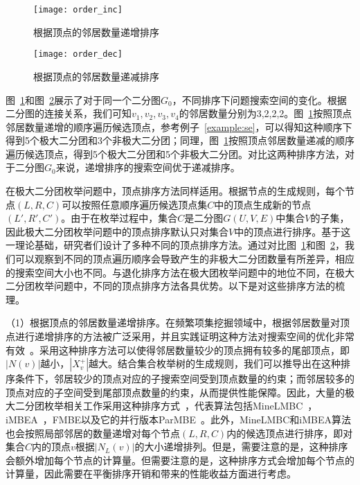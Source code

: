 \begin{figure} [H]
  \center
    \vspace{0.1in}
		\texttt{[image: order\_inc]}
    \vspace{0.05in}
	\caption{根据顶点的邻居数量递增排序}
	\label{fig:order_inc}
\end{figure}


\begin{figure} [H]
  \center
  \vspace{0.1in}
    \texttt{[image: order\_dec]}
    \vspace{0.05in}
  \caption{根据顶点的邻居数量递减排序}
	\label{fig:order_dec}
\end{figure}

\begin{example}
  图~\ref{fig:order_inc}和图~\ref{fig:order_dec}展示了对于同一个二分图$G_0$，不同排序下问题搜索空间的变化。根据二分图的连接关系，我们可知$v_1,v_2,v_3,v_4$的邻居数量分别为3,2,2,2。图~\ref{fig:order_inc}按照顶点邻居数量递增的顺序遍历候选顶点，参考例子~\ref{example:se}，可以得知这种顺序下得到5个极大二分团和3个非极大二分团；同理，图~\ref{fig:order_inc}按照顶点邻居数量递减的顺序遍历候选顶点，得到5个极大二分团和5个非极大二分团。对比这两种排序方法，对于二分图$G_0$来说，递增排序的搜索空间优于递减排序。
\end{example}




在极大二分团枚举问题中，顶点排序方法同样适用。根据节点的生成规则，每个节点$(L,R,C)$可以按照任意顺序遍历候选顶点集$C$中的顶点生成新的节点$(L',R',C')$。由于在枚举过程中，集合$C$是二分图$G(U,V,E)$中集合$V$的子集，因此极大二分团枚举问题中的顶点排序默认只对集合$V$中的顶点进行排序。基于这一理论基础，研究者们设计了多种不同的顶点排序方法。通过对比图~\ref{fig:order_inc}和图~\ref{fig:order_dec}，我们可以观察到不同的顶点遍历顺序会导致产生的非极大二分团数量有所差异，相应的搜索空间大小也不同。与退化排序方法在极大团枚举问题中的地位不同，在极大二分团枚举问题中，不同的顶点排序方法各具优势。以下是对这些排序方法的梳理。

（1）根据顶点的邻居数量递增排序。在频繁项集挖掘领域中，根据邻居数量对顶点进行递增排序的方法被广泛采用，并且实践证明这种方法对搜索空间的优化非常有效~\cite{lcm04}。采用这种排序方法可以使得邻居数量较少的顶点拥有较多的尾部顶点，即$|N(v)|$越小，$|X_v^+|$越大。结合集合枚举树的生成规则，我们可以推导出在这种排序条件下，邻居较少的顶点对应的子搜索空间受到顶点数量的约束；而邻居较多的顶点对应的子空间受到尾部顶点数量的约束，从而提供性能保障。因此，大量的极大二分团枚举相关工作采用这种排序方式~\cite{lcmmbc07,minel06,iMBEA14,mapreduceMBE16,parMBE19,MEB20}，代表算法包括MineLMBC~\cite{minel06}，iMBEA~\cite{iMBEA14}，FMBE以及它的并行版本ParMBE~\cite{parMBE19}。此外，MineLMBC和iMBEA算法也会按照局部邻居的数量递增对每个节点$(L,R,C)$内的候选顶点进行排序，即对集合$C$内的顶点$v$根据$|N_L(v)|$的大小递增排列。但是，需要注意的是，这种排序会额外增加每个节点的计算量。但需要注意的是，这种排序方式会增加每个节点的计算量，因此需要在平衡排序开销和带来的性能收益方面进行考虑。

